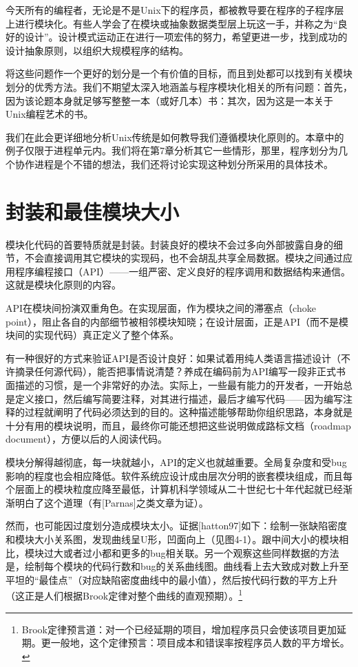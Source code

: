 \documentclass[12pt,oneside]{book}
\begin{document}
\begin{common-format}
今天所有的编程者，无论是不是Unix下的程序员，都被教导要在程序的子程序层上进行模块化。有些人学会了在模块或抽象数据类型层上玩这一手，并称之为“良好的设计”。设计模式运动正在进行一项宏伟的努力，希望更进一步，找到成功的设计抽象原则，以组织大规模程序的结构。

将这些问题作一个更好的划分是一个有价值的目标，而且到处都可以找到有关模块划分的优秀方法。我们不期望太深入地涵盖与程序模块化相关的所有问题：首先，因为该论题本身就足够写整整一本（或好几本）书：其次，因为这是一本关于Unix编程艺术的书。

我们在此会更详细地分析Unix传统是如何教导我们遵循模块化原则的。本章中的例子仅限于进程单元内。我们将在第7章分析其它一些情形，那里，程序划分为几个协作进程是个不错的想法，我们还将讨论实现这种划分所采用的具体技术。


\section{封装和最佳模块大小}
模块化代码的首要特质就是封装。封装良好的模块不会过多向外部披露自身的细节，不会直接调用其它模块的实现码，也不会胡乱共享全局数据。模块之间通过应用程序编程接口（API）——一组严密、定义良好的程序调用和数据结构来通信。这就是模块化原则的内容。

API在模块间扮演双重角色。在实现层面，作为模块之间的滞塞点（choke point），阻止各自的内部细节被相邻模块知晓；在设计层面，正是API（而不是模块间的实现代码）真正定义了整个体系。

有一种很好的方式来验证API是否设计良好：如果试着用纯人类语言描述设计（不许摘录任何源代码），能否把事情说清楚？养成在编码前为API编写一段非正式书面描述的习惯，是一个非常好的办法。实际上，一些最有能力的开发者，一开始总是定义接口，然后编写简要注释，对其进行描述，最后才编写代码——因为编写注释的过程就阐明了代码必须达到的目的。这种描述能够帮助你组织思路，本身就是十分有用的模块说明，而且，最终你可能还想把这些说明做成路标文档（roadmap document），方便以后的人阅读代码。

模块分解得越彻底，每一块就越小，API的定义也就越重要。全局复杂度和受bug影响的程度也会相应降低。软件系统应设计成由层次分明的嵌套模块组成，而且每个层面上的模块粒度应降至最低，计算机科学领域从二十世纪七十年代起就已经渐渐明白了这个道理（有[Parnas]之类文章为证）。

然而，也可能因过度划分造成模块太小。证据[hatton97]如下：绘制一张缺陷密度和模块大小关系图，发现曲线呈U形，凹面向上（见图4-1）。跟中间大小的模块相比，模块过大或者过小都和更多的bug相关联。另一个观察这些同样数据的方法是，绘制每个模块的代码行数和bug的关系曲线图。曲线看上去大致成对数上升至平坦的“最佳点”（对应缺陷密度曲线中的最小值），然后按代码行数的平方上升（这正是人们根据Brook定律对整个曲线的直观预期）。\footnote{ Brook定律预言道：对一个已经延期的项目，增加程序员只会使该项目更加延期。更一般地，这个定律预言：项目成本和错误率按程序员人数的平方增长。}


\end{common-format}
\end{document}
